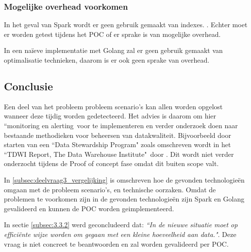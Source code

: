 \subsubsection{\textbf{Mogelijke overhead voorkomen}}

In het geval van Spark wordt er geen gebruik gemaakt van indexes. \parencite{armbrust2015spark}. Echter moet er worden getest tijdens het POC of er sprake is van mogelijke overhead.

In een naïeve implementatie met Golang zal er geen gebruik gemaakt van optimalisatie technieken, daarom is er ook geen sprake van overhead.



    
\subsection{Conclusie}

Een deel van het probleem probleem scenario's kan allen worden opgelost wanneer deze tijdig worden gedetecteerd. Het advies is daarom om hier ``monitoring en alerting\ voor te implementeren en verder onderzoek doen naar bestaande methodieken voor beheersen van datakwaliteit. Bijvoorbeeld door starten van een ``Data Stewardship Program" zoals omschreven wordt in het ``TDWI Report, The Data Warehouse Institute"\ door  \textcite{eckerson2002data}. Dit wordt niet verder onderzocht tijdens de Proof of concept fase omdat dit buiten scope valt.

In \ref{subsec:deelvraag3_vergelijking} is omschreven hoe de gevonden technologieën omgaan met de probleem scenario's, en technische oorzaken. 
Omdat de problemen te voorkomen zijn in de gevonden technologieën zijn Spark en Golang gevalideerd en kunnen de POC worden geimplementeerd.

In sectie \ref{subsec:3.3.2} werd geconcludeerd dat: \textit{``In de nieuwe situatie moet op efficiënte wijze worden om gegaan met een kleine hoeveelheid aan data."}. Deze vraag is niet concreet te beantwoorden en zal worden gevalideerd per POC.